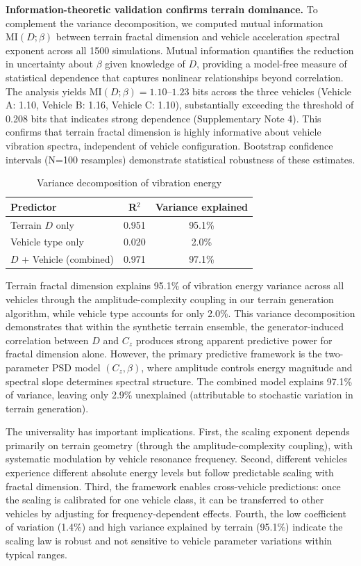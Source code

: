 \documentclass[11pt,letterpaper]{article}
\begin{document}
\textbf{Information-theoretic validation confirms terrain dominance.} To complement the variance decomposition, we computed mutual information $\text{MI}(D;\beta)$ between terrain fractal dimension and vehicle acceleration spectral exponent across all 1500 simulations. Mutual information quantifies the reduction in uncertainty about $\beta$ given knowledge of $D$, providing a model-free measure of statistical dependence that captures nonlinear relationships beyond correlation\cite{Cover2006}. The analysis yields $\text{MI}(D;\beta) = 1.10$--$1.23$ bits across the three vehicles (Vehicle A: 1.10, Vehicle B: 1.16, Vehicle C: 1.10), substantially exceeding the threshold of 0.208 bits that indicates strong dependence (Supplementary Note 4). This confirms that terrain fractal dimension is highly informative about vehicle vibration spectra, independent of vehicle configuration. Bootstrap confidence intervals (N=100 resamples) demonstrate statistical robustness of these estimates.

\begin{table}[h]
\centering
\caption{Variance decomposition of vibration energy}
\begin{tabular}{lcc}
\hline
Predictor & R$^2$ & Variance explained \\
\hline
Terrain $D$ only & 0.951 & 95.1\% \\
Vehicle type only & 0.020 & 2.0\% \\
$D$ + Vehicle (combined) & 0.971 & 97.1\% \\
\hline
\end{tabular}
\label{tab:variance}
\end{table}

Terrain fractal dimension explains 95.1\% of vibration energy variance across all vehicles through the amplitude-complexity coupling in our terrain generation algorithm, while vehicle type accounts for only 2.0\%. This variance decomposition demonstrates that within the synthetic terrain ensemble, the generator-induced correlation between $D$ and $C_z$ produces strong apparent predictive power for fractal dimension alone. However, the primary predictive framework is the two-parameter PSD model $(C_z, \beta)$, where amplitude controls energy magnitude and spectral slope determines spectral structure. The combined model explains 97.1\% of variance, leaving only 2.9\% unexplained (attributable to stochastic variation in terrain generation).

The universality has important implications. First, the scaling exponent depends primarily on terrain geometry (through the amplitude-complexity coupling), with systematic modulation by vehicle resonance frequency. Second, different vehicles experience different absolute energy levels but follow predictable scaling with fractal dimension. Third, the framework enables cross-vehicle predictions: once the scaling is calibrated for one vehicle class, it can be transferred to other vehicles by adjusting for frequency-dependent effects. Fourth, the low coefficient of variation (1.4\%) and high variance explained by terrain (95.1\%) indicate the scaling law is robust and not sensitive to vehicle parameter variations within typical ranges.
\end{document}
